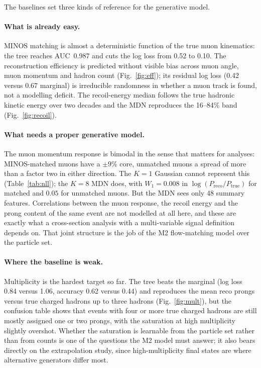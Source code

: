 The baselines set three kinds of reference for the generative model.

\paragraph{What is already easy.} MINOS matching is almost a deterministic function of the true muon
kinematics: the tree reaches AUC~0.987 and cuts the log loss from 0.52 to 0.10. The reconstruction
efficiency is predicted without visible bias across muon angle, muon momentum and hadron count
(Fig.~\ref{fig:eff}); its residual log loss (0.42 versus 0.67 marginal) is irreducible randomness in
whether a muon track is found, not a modelling deficit. The recoil-energy median follows the true hadronic
kinetic energy over two decades and the MDN reproduces the 16--84\% band (Fig.~\ref{fig:recoil}).

\paragraph{What needs a proper generative model.} The muon momentum response is bimodal in the sense that
matters for analyses: MINOS-matched muons have a $\pm 9\%$ core, unmatched muons a spread of more than a
factor two in either direction. The $K=1$ Gaussian cannot represent this (Table~\ref{tab:nll}); the
$K=8$ MDN does, with $W_1 = 0.008$ in $\log(P_\mathrm{reco}/P_\mathrm{true})$ for matched and $0.05$ for
unmatched muons. But the MDN sees only 48 summary features. Correlations between the muon response, the
recoil energy and the prong content of the same event are not modelled at all here, and these are exactly
what a cross-section analysis with a multi-variable signal definition depends on. That joint structure is the
job of the M2 flow-matching model over the particle set.

\paragraph{Where the baseline is weak.} Multiplicity is the hardest target so far. The tree beats the
marginal (log loss 0.84 versus 1.06, accuracy 0.62 versus 0.44) and reproduces the mean reco prongs versus
true charged hadrons up to three hadrons (Fig.~\ref{fig:mult}), but the confusion table shows that events
with four or more true charged hadrons are still mostly assigned one or two prongs, with the saturation at
high multiplicity slightly overshot. Whether the saturation is learnable from the particle set rather than
from counts is one of the questions the M2 model must answer; it also bears directly on the extrapolation
study, since high-multiplicity final states are where alternative generators differ most.

